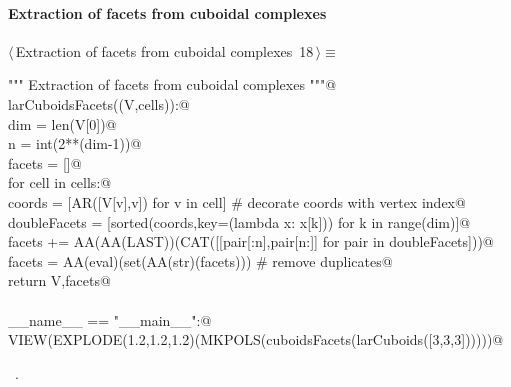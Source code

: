 \documentclass[11pt,oneside]{article}	%
\begin{document}
\paragraph{Extraction of facets from cuboidal complexes}

\begin{flushleft} \small \label{scrap27}
\protect{}$\langle\,$Extraction of facets from cuboidal complexes\nobreak\ {\footnotesize 18}$\,\rangle\equiv$
\vspace{-1ex}
\begin{list}{}{} \item
\mbox{}\verb@""" Extraction of facets from cuboidal complexes """@\\
\mbox{}\verb@def larCuboidsFacets((V,cells)):@\\
\mbox{}\verb@   dim = len(V[0])@\\
\mbox{}\verb@   n = int(2**(dim-1))@\\
\mbox{}\verb@   facets = []@\\
\mbox{}\verb@   for cell in cells:@\\
\mbox{}\verb@      coords = [AR([V[v],v]) for v in cell] # decorate coords with vertex index@\\
\mbox{}\verb@      doubleFacets = [sorted(coords,key=(lambda x: x[k])) for k in range(dim)]@\\
\mbox{}\verb@      facets += AA(AA(LAST))(CAT([[pair[:n],pair[n:]] for pair in doubleFacets]))@\\
\mbox{}\verb@   facets = AA(eval)(set(AA(str)(facets))) # remove duplicates@\\
\mbox{}\verb@   return V,facets@\\
\mbox{}\verb@@\\
\mbox{}\verb@if __name__ == "__main__":@\\
\mbox{}\verb@   VIEW(EXPLODE(1.2,1.2,1.2)(MKPOLS(cuboidsFacets(larCuboids([3,3,3])))))@\\
\mbox{}\verb@@{\NWsep}
\end{list}
\vspace{-1ex}
\footnotesize\addtolength{\baselineskip}{-1ex}
\begin{list}{}{\setlength{\itemsep}{-\parsep}\setlength{\itemindent}{-\leftmargin}}
\item \NWtxtMacroRefIn\ .
\end{list}
\end{flushleft}
\end{document}
